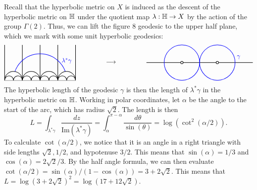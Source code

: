 \documentclass{pset}
\begin{document}
\begin{solution}
  Recall that the hyperbolic metric on $X$ is induced as the descent of the hyperbolic metric on $\mathbb{H}$ under the quotient map $\lambda : \mathbb{H} \to X$ by the action of the group $\Gamma(2)$. Thus, we can lift the figure 8 geodesic to the upper half plane, which we mark with some unit hyperbolic geodesics:
  \[
  \begin{tikzpicture}
  \begin{scope}[xshift = 0, yshift=0]
    \foreach \x in {-1,0,1,2,3} {
      \draw[thick, black] (\x,0) -- (\x,2);
    }

      \draw[thick, black] (-1,0) -- (3,0);

      \node[blue] at (2.5,1.1) {$\lambda^*\gamma$};
    \draw[thick, blue] (2.5,0) arc (0:180:1.5);

    \foreach \x in {-1,0,1,2} {
      \pgfmathsetmacro{\radius}{(\x+1-\x)/2}
      \pgfmathsetmacro{\radiuss}{(\x+1-\x)/4}
      \fill[white] (\x+\radius+1/2,0) arc (0:180:\radius);
      \draw[thick, black] (\x+\radius+1/2,0) arc (0:180:\radius);
      \draw[thick, black] (\x+\radius+1/2,0) arc (0:180:\radiuss);
      \draw[thick, black] (\x+\radius,0) arc (0:180:\radiuss);
    }
  \end{scope}

  \begin{scope}[xshift = 10cm, yshift=0]
      \node at (-5,1) {$\longrightarrow$};
      \draw[thick, black] (-3,1) -- (3,1);

      \draw[thick, blue] (1,1) circle (1);
      \draw[thick, blue] (-1,1) circle (1);

      \node[blue] at (2.2,1.3) {$\gamma$};
      \draw[thick, black, fill=white] (1,1) circle (2pt);
      \draw[thick, black, fill=white] (-1,1) circle (2pt);
  \end{scope}
  \end{tikzpicture}
  \]
  The hyperbolic length of the geodesic $\gamma$ is then the length of $\lambda^*\gamma$ in the hyperbolic metric on $\mathbb{H}$. Working in polar coordinates, let $\alpha$ be the angle to the start of the arc, which has radius $\sqrt{2}$. The length is then
  \[
    L = \int_{\lambda^* \gamma} \frac{dz}{\textrm{Im}(\lambda^* \gamma)} = \int_\alpha^{\pi - \alpha} \frac{d\theta}{\sin(\theta)} = \log(\cot^2(\alpha/2)).
  \]
  To calculate $\cot(\alpha/2)$, we notice that it is an angle in a right triangle with side lengths $\sqrt{2}, 1/2$, and hypotenuse $3/2$. This means that $\sin(\alpha) = 1/3$ and $\cos(\alpha)=2\sqrt{2}/3$. By the half angle formula, we can then evaluate $\cot(\alpha/2) = \sin(\alpha)/(1-\cos(\alpha))  = 3+2\sqrt{2}.$ This means that $L=\log (3+2\sqrt{2})^2 = \log(17+12\sqrt{2})$.
\end{solution}
\end{document}
